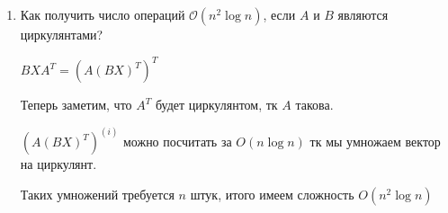 \documentclass[a4paper, 11pt]{article}
\begin{document}
\begin{enumerate}
\begin{enumerate}
			$(A \otimes B) x = \begin{pmatrix}
				a_{11} B & \dots & a_{1n} B \\
				\vdots & \dots & \vdots \\
				a_{n1} B & \dots & a_{nn} B\\
			\end{pmatrix} \begin{pmatrix}
			x_{11} \\
			\vdots \\
			x_n^2 \\
		\end{pmatrix} = \begin{pmatrix}
		B_{(1)} X^{(1)} & \dots & B_{(1)} X^{(n)} \\
		\vdots & \dots & \vdots \\
		B_{(n)} X^{(1)} & \dots& B_{(n)} X^{(n)} \\
	\end{pmatrix} \cdot \begin{pmatrix}
	a_{11} & \dots & a_{1n} \\
	\vdots & \dots & \vdots \\
	a_{1n} & \dots & a_{nn} \\
\end{pmatrix} =  \begin{pmatrix}
	b_{11} & \dots & b_{1n} \\
	\vdots & \dots & \vdots \\
	b_{n1} & \dots & b_{nn} \\
\end{pmatrix} \cdot \begin{pmatrix}
	x_{11} & \dots& x_{1n} \\
	\vdots & \dots & \vdots \\ 
	x_{n1} & \dots& x_{nn} \\
\end{pmatrix} \cdot \begin{pmatrix}
	a_{11} & \dots & x_{n1} \\
	\vdots & \dots & \vdots \\
	a_{1n} \dots & a_{nn} \\
\end{pmatrix} = BXA^T$


		Считаем сложность. $\forall i, j B_{(i)} X^{(j)}$ требует $2n - 1$ операций для каждого из $n^2$ умножений. 
		
		$BXA^T$ из аналогичных соображений требует столько же в асимптотике, а именно $O(n^3)$
		
		\item Как получить число операций $\mathcal{O}(n^2\log n)$, если $A$ и $B$ являются циркулянтами?
		
			$BXA^T = (A(BX)^T)^T$
			
			Теперь заметим, что $A^T$ будет циркулянтом, тк $A$ такова.
			
			$(A(BX)^T)^{(i)}$ можно посчитать за $O(n \log n)$ тк мы умножаем вектор на циркулянт. 
			
			Таких умножений требуется $n$ штук, итого имеем сложность $O(n^2 \log n)$
		
	\end{enumerate}
\end{enumerate}
\end{document}
